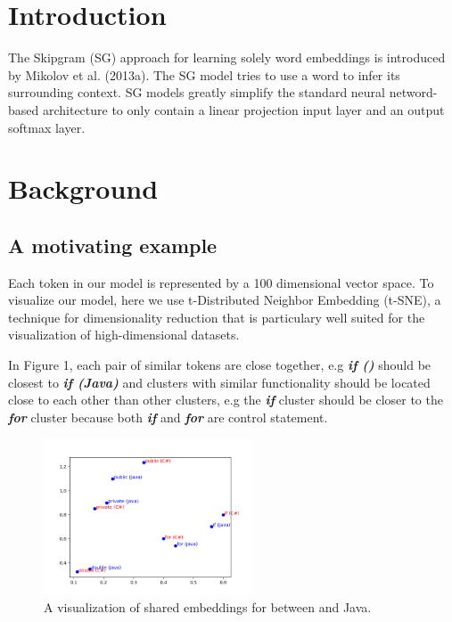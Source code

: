 \section{Introduction}

The Skipgram (SG) approach for learning solely word embeddings is introduced by Mikolov et al. (2013a). The SG model tries to use a word to infer its surrounding context. SG models greatly simplify the standard neural netword-based architecture to only contain a linear projection input layer and an output softmax layer.

\section{Background}


\subsection{A motivating example}
Each token in our model is represented by a 100 dimensional vector space. To visualize our model, here we use t-Distributed Neighbor Embedding (t-SNE), a technique for dimensionality reduction that is particulary well suited for the visualization of high-dimensional datasets. 

In Figure 1, each pair of similar tokens are close together, e.g \textit{\textbf{if ()}} should be closest to \textit{\textbf{if (Java)}} and clusters with similar functionality should be located close to each other than other clusters, e.g the \textit{\textbf{if}} cluster should be closer to the \textit{\textbf{for}} cluster because both \textit{\textbf{if}} and \textit{\textbf{for}} are control statement.

\begin{figure}[t!]
	\includegraphics[width=0.55\textwidth]{example_bi2vec_tsne}
	\caption{A visualization of shared embeddings for between  and Java.}
	\label{fig:clf}
\end{figure}

